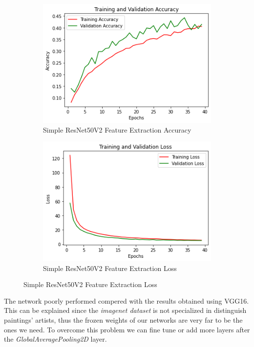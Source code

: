 \begin{figure}[H]
	\begin{subfigure}{0.5\textwidth}
		\includegraphics[width=0.9\linewidth]{img/resnet50v2/resnet50acc.png} 
		\caption{Simple ResNet50V2 Feature Extraction Accuracy}
	\end{subfigure}
	\begin{subfigure}{0.5\textwidth}
		\includegraphics[width=0.9\linewidth]{img/resnet50v2/resnet50loss.png}
		\caption{Simple ResNet50V2 Feature Extraction Loss}
	\end{subfigure}
\end{figure}

The network poorly performed compered with the results obtained using VGG16. This can be explained since the \textit{imagenet dataset} is not specialized in distinguish paintings' artists, thus the frozen weights of our networks are very far to be the ones we need. To overcome this problem we can fine tune or add more layers after the \textit{GlobalAveragePooling2D} layer.


